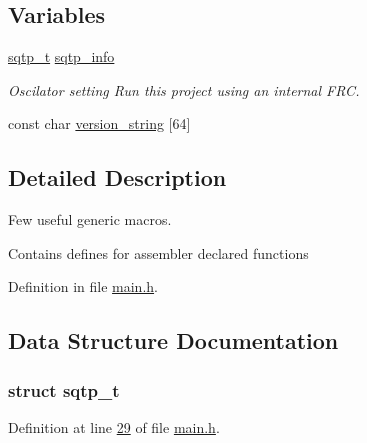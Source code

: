 \subsection*{Variables}
\begin{DoxyCompactItemize}
\item 
\hyperlink{a00033_d3/d95/a00779}{sqtp\+\_\+t} \hyperlink{a00033_a4e1e8b365cce7a6d497671681eb5823c}{sqtp\+\_\+info}
\begin{DoxyCompactList}\small\item\em Oscilator setting Run this project using an internal F\+R\+C. \end{DoxyCompactList}\item 
const char \hyperlink{a00033_a9913e6dccd88bd052d3e8e9d73da4ede}{version\+\_\+string} \mbox{[}64\mbox{]}
\end{DoxyCompactItemize}


\subsection{Detailed Description}
Few useful generic macros. 

Contains defines for assembler declared functions 

Definition in file \hyperlink{a00033_source}{main.\+h}.



\subsection{Data Structure Documentation}
\label{d3/d95/a00779}
\hypertarget{a00033_d3/d95/a00779}{}
\subsubsection{struct sqtp\+\_\+t}


Definition at line \hyperlink{a00033_source_l00029}{29} of file \hyperlink{a00033_source}{main.\+h}.



